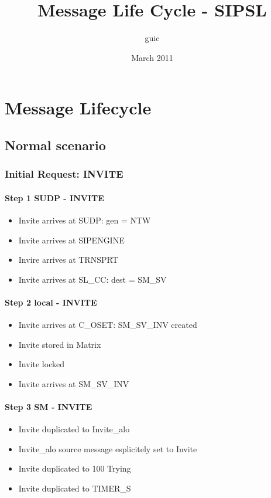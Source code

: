 \documentclass[a4paper]{report}
\title{Message Life Cycle - SIPSL}
\author{guic}
\date{March 2011}
\begin{document}
	\small
	\maketitle 
\chapter{Message Lifecycle}
\section{Normal scenario}

\subsection{Initial Request: INVITE}

\subsubsection{Step 1 SUDP - INVITE} 
\begin{itemize}
   \item Invite arrives at SUDP: gen = NTW
   \item Invite arrives at SIPENGINE
   \item Invire arrives at TRNSPRT
   \item Invite arrives at SL\_CC: dest = SM\_SV
\end{itemize}

\subsubsection{Step 2 local - INVITE}
\begin{itemize}
   \item Invite arrives at C\_OSET: SM\_SV\_INV created
   \item Invite stored in Matrix
   \item Invite locked
   \item Invite arrives at SM\_SV\_INV
\end{itemize}

\subsubsection{Step 3 SM - INVITE} 
\begin{itemize}
   \item Invite duplicated to Invite\_alo
   \item Invite\_alo source message esplicitely set to Invite
   \item Invite duplicated to 100 Trying
   \item Invite duplicated to TIMER\_S 
\end{itemize}
 
\end{document}
